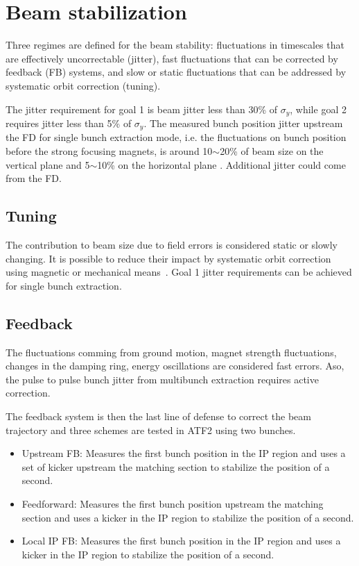 {{\section{Beam stabilization}
Three regimes are defined for the beam stability: fluctuations in timescales that are effectively uncorrectable (jitter), fast fluctuations that can be corrected by feedback (FB) systems, and slow or static fluctuations that can be addressed by systematic orbit correction (tuning).\par
The jitter requirement for goal 1 is beam jitter less than 30\% of $\sigma_y$, while goal 2 requires jitter less than 5\% of $\sigma_y$. The measured bunch position jitter upstream the FD for single bunch extraction mode, i.e. the fluctuations on bunch position before the strong focusing magnets, is around 10$\sim$20\% of beam size on the vertical plane and 5$\sim$10\% on the horizontal plane \cite{PateckiJitter}. Additional jitter could come from the FD.\par
\subsection{Tuning}
The contribution to beam size due to field errors is considered static or slowly changing. It is possible to reduce their impact by systematic orbit correction using magnetic or mechanical means~\cite{ATF2prop}. Goal 1 jitter requirements can be achieved for single bunch extraction.\par
\subsection{Feedback}
The fluctuations comming from ground motion, magnet strength fluctuations, changes in the damping ring, energy oscillations are considered fast errors. Aso, the pulse to pulse bunch jitter from multibunch extraction requires active correction.\par 
The feedback system is then the last line of defense to correct the beam trajectory and three schemes are tested in ATF2 using two bunches.\par
\begin{itemize}
 \item Upstream FB: Measures the first bunch position in the IP region and uses a set of kicker upstream the matching section to stabilize the position of a second.
 \item Feedforward: Measures the first bunch position upstream the matching section and uses a kicker in the IP region to stabilize the position of a second.
 \item Local IP FB: Measures the first bunch position in the IP region and uses a kicker in the IP region to stabilize the position of a second.
\end{itemize}

}}
